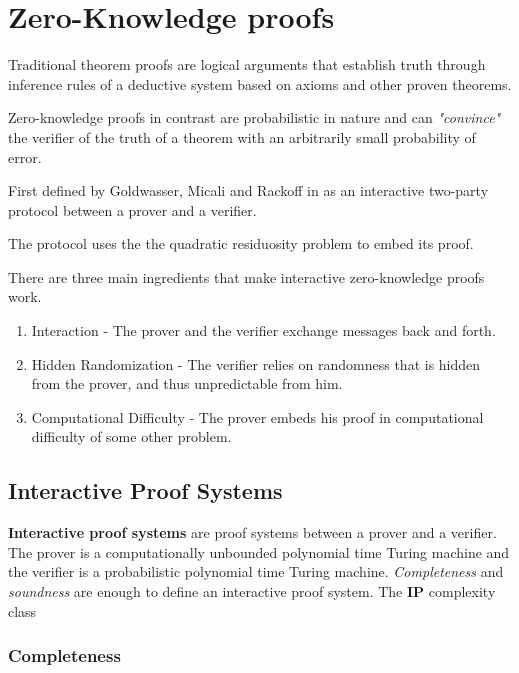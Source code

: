\section{Zero-Knowledge proofs}

Traditional theorem proofs are logical arguments that establish truth through inference rules of a deductive system based on axioms and other proven theorems.

\bigskip

Zero-knowledge proofs in contrast are probabilistic in nature and can \textit{"convince"} the verifier of the truth of a theorem with an arbitrarily small probability of error.

\bigskip

First defined by Goldwasser, Micali and Rackoff in \cite{GMR} as an interactive two-party protocol between a prover and a verifier.

The protocol uses the the quadratic residuosity problem to embed its proof.

\bigskip

There are three main ingredients that make interactive zero-knowledge proofs work.

\begin{enumerate}
	\item Interaction - The prover and the verifier exchange messages back and forth.
	\item Hidden Randomization - The verifier relies on randomness that is hidden from the prover, and thus unpredictable from him.
	\item Computational Difficulty - The prover embeds his proof in computational difficulty of some other problem.
\end{enumerate}

\newpage

\subsection{Interactive Proof Systems}
\textbf{Interactive proof systems} are proof systems between a prover and a verifier.
The prover is a computationally unbounded polynomial time Turing machine and the verifier is a probabilistic polynomial time Turing machine.
\textit{Completeness} and \textit{soundness} are enough to define an interactive proof system. The \textbf{IP} complexity class 

\subsubsection{Completeness}

